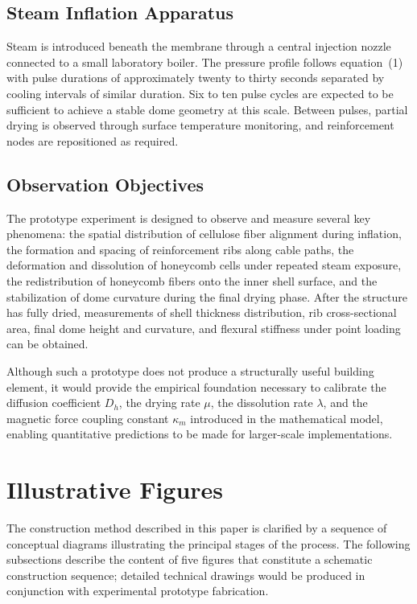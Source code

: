 \documentclass[12pt,a4paper]{article}
\begin{document}
\subsection{Steam Inflation Apparatus}

Steam is introduced beneath the membrane through a central injection
nozzle connected to a small laboratory boiler. The pressure profile
follows equation~(1) with pulse durations of approximately twenty to
thirty seconds separated by cooling intervals of similar duration. Six
to ten pulse cycles are expected to be sufficient to achieve a stable
dome geometry at this scale. Between pulses, partial drying is observed
through surface temperature monitoring, and reinforcement nodes are
repositioned as required.

\subsection{Observation Objectives}

The prototype experiment is designed to observe and measure several key
phenomena: the spatial distribution of cellulose fiber alignment during
inflation, the formation and spacing of reinforcement ribs along cable
paths, the deformation and dissolution of honeycomb cells under repeated
steam exposure, the redistribution of honeycomb fibers onto the inner
shell surface, and the stabilization of dome curvature during the final
drying phase. After the structure has fully dried, measurements of
shell thickness distribution, rib cross-sectional area, final dome
height and curvature, and flexural stiffness under point loading can
be obtained.

Although such a prototype does not produce a structurally useful
building element, it would provide the empirical foundation necessary
to calibrate the diffusion coefficient $D_h$, the drying rate $\mu$,
the dissolution rate $\lambda$, and the magnetic force coupling
constant $\kappa_m$ introduced in the mathematical model, enabling
quantitative predictions to be made for larger-scale implementations.

\section{Illustrative Figures}

The construction method described in this paper is clarified by a
sequence of conceptual diagrams illustrating the principal stages of
the process. The following subsections describe the content of five
figures that constitute a schematic construction sequence; detailed
technical drawings would be produced in conjunction with experimental
prototype fabrication.
\end{document}
